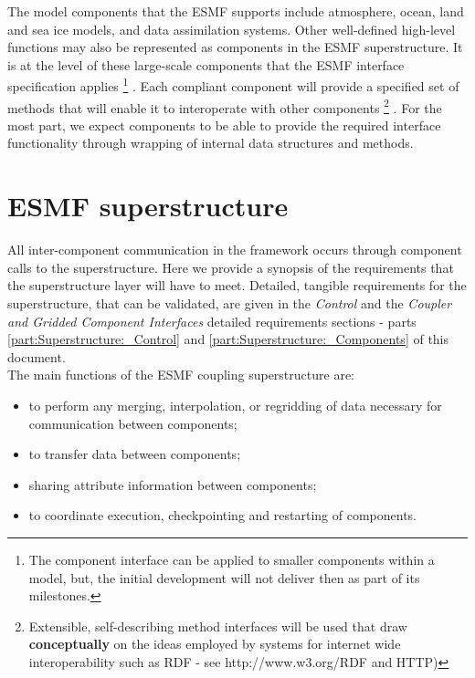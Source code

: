 The model components that the ESMF supports include atmosphere, ocean,
land and sea ice models, and data assimilation systems. Other
well-defined high-level functions may also be represented as
components in the ESMF superstructure.  It is at the level of these
large-scale components that the ESMF interface specification applies
\footnote{
The component interface can be applied to smaller components within a model,
but, the initial development will not deliver then as part of its milestones.
}
.
Each compliant component will provide a specified set of methods that
will enable it to interoperate with other components \footnote{
Extensible, self-describing method interfaces will be used that draw
{\bf conceptually} on the ideas employed by systems for internet
wide interoperability such as RDF - see http://www.w3.org/RDF and HTTP)
}
.  For the most
part, we expect components to be able to provide the required
interface functionality through wrapping of internal data structures
and methods. 

\section{ESMF superstructure}
\label{sec:ESMF_superstructure}

All inter-component communication in the framework occurs through 
component calls to the superstructure. Here we provide a synopsis of the
requirements that the superstructure layer will have to meet.
Detailed, tangible requirements for the superstructure, that can
be validated, are given in the {\it Control} and the {\it Coupler and
Gridded Component Interfaces} detailed requirements sections -
parts \ref{part:Superstructure:_Control} and \ref{part:Superstructure:_Components} of this document. \\

\noindent The main functions of the ESMF coupling superstructure are:

\begin{itemize}
\item to perform any merging, interpolation, or regridding 
of data necessary for communication between components;
\item to transfer data between components;
\item sharing attribute information between components;
\item to coordinate execution, checkpointing and restarting of
  components.
\end{itemize}

